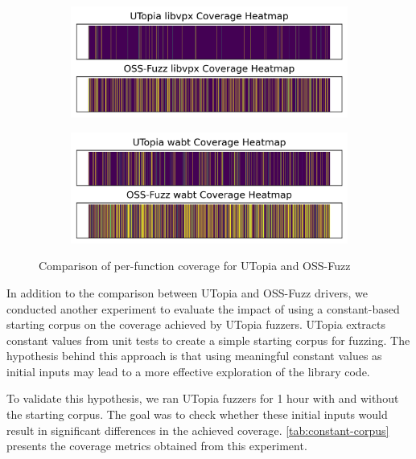 \documentclass[a4paper,11pt,oneside]{report}
\begin{document}
\begin{figure}[ht]
\begin{subfigure}{0.5\textwidth}
    \end{subfigure}%
    \hfill
    \begin{subfigure}{0.5\textwidth}
        \centering
        \includegraphics[width=\linewidth]{figures/coverage_plot_libvpx.png}
    \end{subfigure}%
    \hfill
    \begin{subfigure}{0.5\textwidth}
        \centering
        \includegraphics[width=\linewidth]{figures/coverage_plot_wabt.png}
    \end{subfigure}
    \caption{Comparison of per-function coverage for UTopia and OSS-Fuzz}
    \label{fig:heatmaps}
\end{figure}







In addition to the comparison between UTopia and OSS-Fuzz drivers, 
we conducted another experiment to evaluate the impact of using 
a constant-based starting corpus on the coverage achieved 
by UTopia fuzzers. UTopia extracts constant values from unit 
tests to create a simple starting corpus for fuzzing. 
The hypothesis behind this approach is that using meaningful 
constant values as initial inputs may lead to a more effective 
exploration of the library code.

To validate this hypothesis, we ran UTopia fuzzers for 1 hour with 
and without the starting corpus. The goal was to check whether 
these initial inputs would result in significant differences in the achieved 
coverage. \autoref{tab:constant-corpus} presents the coverage metrics obtained from this experiment.
\end{document}
